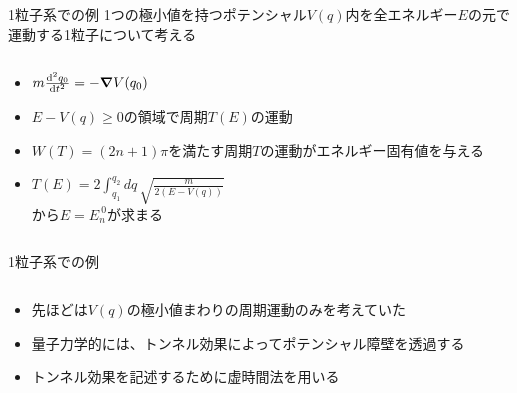 \documentclass[14pt,aspectratio=169,xcolor=dvipsnames,table,dvipdfmx]{beamer}
\theoremstyle{definition}
\begin{document}
\begin{frame}{1粒子系での例}
  1つの極小値を持つポテンシャル$V(q)$内を全エネルギー$E$の元で運動する1粒子について考える
  \begin{columns}[t]
    \begin{column}{.5\textwidth}
      \begin{itemize}
        \item $m\dv[2]{q_0}{t} = -\grad V(q_0)$
        \item $E-V(q)\geq0$の領域で周期$T(E)$の運動
        \item $W(T)=(2n+1)\pi$を満たす周期$T$の運動がエネルギー固有値を与える
        \item $T(E)=2\int_{q_1}^{q_2}dq\,\sqrt{\frac{m}{2(E-V(q))}}$\\から$E=E_{n}^{~0}$が求まる
      \end{itemize}
    \end{column}
    \begin{column}{.5\textwidth}
    \end{column}
  \end{columns}
\end{frame}

\begin{frame}{1粒子系での例}
  \begin{columns}[t]
    \begin{column}{.54\textwidth}
      \begin{itemize}
        \item 先ほどは$V(q)$の極小値まわりの周期運動のみを考えていた
        \item 量子力学的には、トンネル効果によってポテンシャル障壁を透過する
        \item トンネル効果を記述するために虚時間法を用いる
      \end{itemize}
    \end{column}
    \begin{column}{.5\textwidth}
    \end{column}
  \end{columns}
\end{frame}
\end{document}
